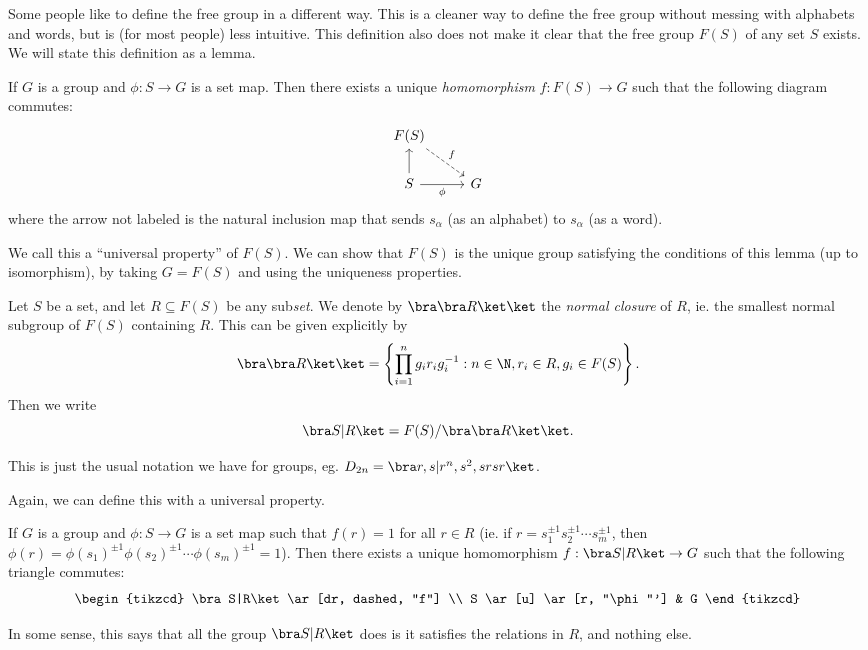 \documentclass[a4paper]{article}
\begin{document}
Some people like to define the free group in a different way. This is a cleaner way to define the free group without messing with alphabets and words, but is (for most people) less intuitive. This definition also does not make it clear that the free group $F(S)$ of any set $S$ exists. We will state this definition as a lemma.
\begin{lemma}
  If $G$ is a group and $\phi: S\to G$ is a set map. Then there exists a unique \emph{homomorphism} $f: F(S) \to G$ such that the following diagram commutes:
  \[
    \begin{tikzcd}
      F(S) \ar[dr, dashed,  "f"] \\
      S \ar[u] \ar[r, "\phi"'] & G
    \end{tikzcd}
  \]
  where the arrow not labeled is the natural inclusion map that sends $s_\alpha$ (as an alphabet) to $s_\alpha$ (as a word).
\end{lemma}
We call this a ``universal property'' of $F(S)$. We can show that $F(S)$ is the unique group satisfying the conditions of this lemma (up to isomorphism), by taking $G = F(S)$ and using the uniqueness properties.

\begin{defi}
  Let $S$ be a set, and let $R \subseteq F(S)$ be any sub\emph{set}. We denote by $\bra \bra R\ket\ket$ the \emph{normal closure} of $R$, ie. the smallest normal subgroup of $F(S)$ containing $R$. This can be given explicitly by
  \[
    \bra \bra R\ket \ket = \left\{\prod_{i = 1}^n g_i r_i g_i^{-1}: n \in \N, r_i \in R, g_i \in F(S)\right\}.
  \]
  Then we write
  \[
    \bra S | R\ket  = F(S)/\bra\bra R\ket\ket.
  \]
\end{defi}
This is just the usual notation we have for groups, eg. $D_{2n} = \bra r, s | r^n, s^2, srsr\ket$.

Again, we can define this with a universal property.
\begin{lemma}
  If $G$ is a group and $\phi: S \to G$ is a set map such that $f(r) = 1$ for all $r \in R$ (ie. if $r = s_1^{\pm 1}s_2^{\pm 1}\cdots s_m^{\pm 1}$, then $\phi(r) = \phi(s_1)^{\pm 1}\phi(s_2)^{\pm 1} \cdots \phi(s_m)^{\pm 1} = 1$). Then there exists a unique homomorphism $f: \bra S | R\ket \to G$ such that the following triangle commutes:
  \[
    \begin{tikzcd}
      \bra S|R\ket \ar[dr, dashed,  "f"] \\
      S \ar[u] \ar[r, "\phi"'] & G
    \end{tikzcd}
  \]
\end{lemma}
In some sense, this says that all the group $\bra S|R \ket$ does is it satisfies the relations in $R$, and nothing else.
\end{document}
